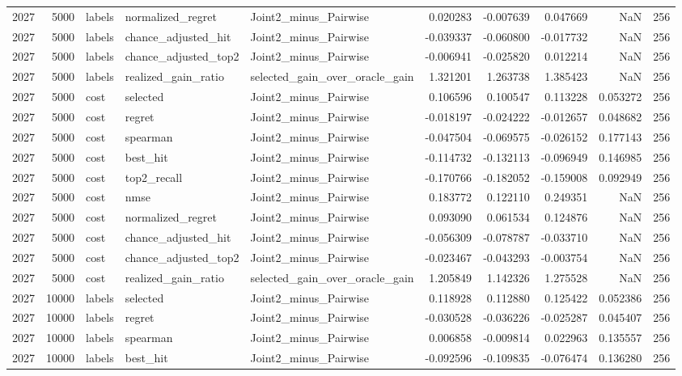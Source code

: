 \begin{tabular}{rrlllrrrrr}
2027 & 5000 & labels & normalized_regret & Joint2_minus_Pairwise & 0.020283 & -0.007639 & 0.047669 & NaN & 256 \\
2027 & 5000 & labels & chance_adjusted_hit & Joint2_minus_Pairwise & -0.039337 & -0.060800 & -0.017732 & NaN & 256 \\
2027 & 5000 & labels & chance_adjusted_top2 & Joint2_minus_Pairwise & -0.006941 & -0.025820 & 0.012214 & NaN & 256 \\
2027 & 5000 & labels & realized_gain_ratio & selected_gain_over_oracle_gain & 1.321201 & 1.263738 & 1.385423 & NaN & 256 \\
2027 & 5000 & cost & selected & Joint2_minus_Pairwise & 0.106596 & 0.100547 & 0.113228 & 0.053272 & 256 \\
2027 & 5000 & cost & regret & Joint2_minus_Pairwise & -0.018197 & -0.024222 & -0.012657 & 0.048682 & 256 \\
2027 & 5000 & cost & spearman & Joint2_minus_Pairwise & -0.047504 & -0.069575 & -0.026152 & 0.177143 & 256 \\
2027 & 5000 & cost & best_hit & Joint2_minus_Pairwise & -0.114732 & -0.132113 & -0.096949 & 0.146985 & 256 \\
2027 & 5000 & cost & top2_recall & Joint2_minus_Pairwise & -0.170766 & -0.182052 & -0.159008 & 0.092949 & 256 \\
2027 & 5000 & cost & nmse & Joint2_minus_Pairwise & 0.183772 & 0.122110 & 0.249351 & NaN & 256 \\
2027 & 5000 & cost & normalized_regret & Joint2_minus_Pairwise & 0.093090 & 0.061534 & 0.124876 & NaN & 256 \\
2027 & 5000 & cost & chance_adjusted_hit & Joint2_minus_Pairwise & -0.056309 & -0.078787 & -0.033710 & NaN & 256 \\
2027 & 5000 & cost & chance_adjusted_top2 & Joint2_minus_Pairwise & -0.023467 & -0.043293 & -0.003754 & NaN & 256 \\
2027 & 5000 & cost & realized_gain_ratio & selected_gain_over_oracle_gain & 1.205849 & 1.142326 & 1.275528 & NaN & 256 \\
2027 & 10000 & labels & selected & Joint2_minus_Pairwise & 0.118928 & 0.112880 & 0.125422 & 0.052386 & 256 \\
2027 & 10000 & labels & regret & Joint2_minus_Pairwise & -0.030528 & -0.036226 & -0.025287 & 0.045407 & 256 \\
2027 & 10000 & labels & spearman & Joint2_minus_Pairwise & 0.006858 & -0.009814 & 0.022963 & 0.135557 & 256 \\
2027 & 10000 & labels & best_hit & Joint2_minus_Pairwise & -0.092596 & -0.109835 & -0.076474 & 0.136280 & 256 \\

\end{tabular}
